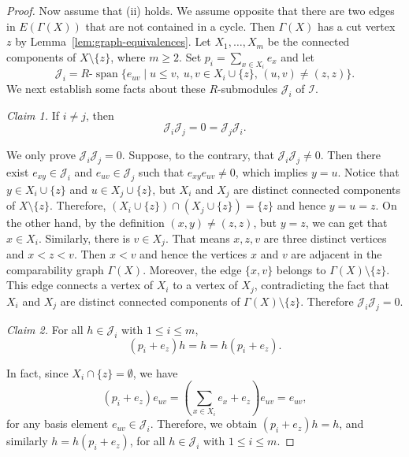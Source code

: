 \documentclass[reqno]{amsart}
\numberwithin{equation}{section}
\theoremstyle{plain}
\theoremstyle{definition}
\newcommand{\I}{\mathcal I}
\newcommand{\Span}{\operatorname{span}}
\begin{document}
\begin{proof}
Now assume that (ii) holds. We assume opposite that there are two edges in $E(\Gamma(X))$ that are not contained in a cycle.
Then $\Gamma(X)$ has a cut vertex $z$ by Lemma~\ref{lem:graph-equivalences}.
Let $X_1,\ldots,X_m$ be the connected components of $X\setminus\{z\}$, where $m\geq2$.
Set $p_i=\sum_{x\in X_i}e_x$ and let
\begin{equation*}
\mathcal{J}_i
=R\text{-}\Span\{e_{uv}\mid u\leq v,\ u,v\in X_i\cup\{z\},\,
(u,v)\neq(z,z)\}.
\end{equation*}
We next establish some facts about these $R$-submodules $\mathcal{J}_i$ of $\I$.

\smallskip
\noindent\emph{Claim 1.}
If $i\neq j$, then
\begin{equation}\label{eq:Ji-cross-zero}
\mathcal J_i\mathcal J_j=0=\mathcal J_j\mathcal J_i.
\end{equation}

We only prove $\mathcal J_i\mathcal J_j=0$. Suppose, to the contrary, that $\mathcal J_i\mathcal J_j\neq0$.
Then there exist $e_{xy}\in\mathcal J_i$ and $e_{uv}\in\mathcal J_j$ such that
$e_{xy}e_{uv}\neq 0$, which implies $y=u$. Notice that $y\in X_i\cup\{z\}$ and $u\in X_j\cup\{z\}$, but
$X_i$ and $X_j$ are distinct connected components of $X\setminus\{z\}$.
Therefore, $(X_i\cup\{z\})\cap(X_j\cup\{z\})=\{z\}$ and hence $y=u=z$. On the other hand,
by the definition $(x,y)\neq (z,z)$, but $y=z$, we can get that $x\in X_i$.
Similarly, there is $v\in X_j$. That means $x,z,v$ are three distinct vertices and $x<z<v$.
Then $x<v$ and hence the vertices $x$ and $v$ are
adjacent in the comparability graph $\Gamma(X)$. Moreover, the edge $\{x,v\}$ belongs to
$\Gamma(X)\setminus\{z\}$. This edge connects a vertex of $X_i$ to
a vertex of $X_j$, contradicting the fact that $X_i$ and $X_j$ are
distinct connected components of $\Gamma(X)\setminus\{z\}$.
Therefore $\mathcal J_i\mathcal J_j=0$.

\smallskip
\noindent\emph{Claim 2.}
For all $h\in\mathcal J_i$ with $1\leq i\leq m$,
\begin{equation}\label{eq:local-unit}
(p_i+e_z)h=h=h(p_i+e_z).
\end{equation}

In fact, since $X_i\cap \{z\}=\emptyset$, we have
\[
(p_i+e_z)e_{uv}=\left(\sum_{x\in X_i}e_x+e_z\right)e_{uv}=e_{uv},
\]
for any basis element $e_{uv}\in \mathcal J_i$. Therefore, we obtain $(p_i+e_z)h=h$, and
similarly $h=h(p_i+e_z)$, for all $h\in\mathcal J_i$ with $1\leq i\leq m$.


\end{proof}
\end{document}
